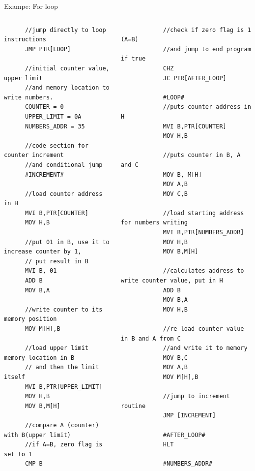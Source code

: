 \documentclass{beamer}
\begin{document}
  \begin{frame}[fragile]{Exampe: For loop}
    \fontsize{6pt}{5.2}\selectfont
    \begin{columns}
      \begin{column}{0.5\textwidth}
      \begin{verbatim}
      //jump directly to loop instructions
      JMP PTR[LOOP]
      
      //initial counter value, upper limit 
      //and memory location to write numbers.
      COUNTER = 0 
      UPPER_LIMIT = 0A
      NUMBERS_ADDR = 35
      
      //code section for counter increment
      //and conditional jump
      #INCREMENT# 
      
      //load counter address in H
      MVI B,PTR[COUNTER] 
      MOV H,B 
      
      //put 01 in B, use it to increase counter by 1,
      // put result in B
      MVI B, 01 
      ADD B 
      MOV B,A 
      
      //write counter to its memory position
      MOV M[H],B  
      
      //load upper limit memory location in B
      // and then the limit itself
      MVI B,PTR[UPPER_LIMIT] 
      MOV H,B 
      MOV B,M[H] 

      //compare A (counter) with B(upper limit)
      //if A=B, zero flag is set to 1
      CMP B 
      \end{verbatim}
         \end{column}
      \begin{column}{0.7\textwidth}  %
          \begin{verbatim}
            //check if zero flag is 1 (A=B) 
            //and jump to end program if true
            CHZ 
            JC PTR[AFTER_LOOP]
            
            #LOOP#
            //puts counter address in H
            MVI B,PTR[COUNTER]
            MOV H,B
            
            //puts counter in B, A and C
            MOV B, M[H]
            MOV A,B
            MOV C,B
            
            //load starting address for numbers writing
            MVI B,PTR[NUMBERS_ADDR]
            MOV H,B
            MOV B,M[H]
            
            //calculates address to write counter value, put in H
            ADD B
            MOV B,A
            MOV H,B
            
            //re-load counter value in B and A from C 
            //and write it to memory
            MOV B,C
            MOV A,B
            MOV M[H],B
            
            //jump to increment routine
            JMP [INCREMENT]
            
            #AFTER_LOOP# 
            HLT
            
            #NUMBERS_ADDR#
          \end{verbatim}
      \end{column}
      \end{columns}
  \end{frame}
  
\end{document}
